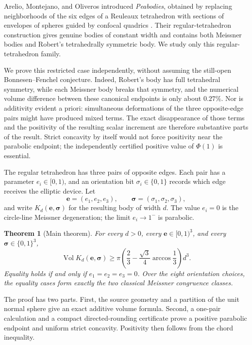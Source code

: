 \documentclass[11pt]{article}
\numberwithin{equation}{section}
\newtheorem{theorem}{Theorem}[section]
\theoremstyle{remark}
\newcommand{\Vol}{\operatorname{Vol}}
\begin{document}
Arelio, Montejano, and Oliveros introduced \emph{Peabodies}, obtained by replacing neighborhoods of the six edges of a Reuleaux tetrahedron with sections of envelopes of spheres guided by confocal quadrics \cite{ArelioMontejanoOliveros2023}.  Their regular-tetrahedron construction gives genuine bodies of constant width and contains both Meissner bodies and Robert's tetrahedrally symmetric body.  We study only this regular-tetrahedron family.

We prove this restricted case independently, without assuming the still-open Bonnesen--Fenchel conjecture.  Indeed, Robert's body has full tetrahedral symmetry, while each Meissner body breaks that symmetry, and the numerical volume difference between these canonical endpoints is only about $0.27\%$.  Nor is additivity evident a priori: simultaneous deformations of the three opposite-edge pairs might have produced mixed terms.  The exact disappearance of those terms and the positivity of the resulting scalar increment are therefore substantive parts of the result.  Strict concavity by itself would not force positivity near the parabolic endpoint; the independently certified positive value of $\Phi(1)$ is essential.

The regular tetrahedron has three pairs of opposite edges.  Each pair has a parameter \(e_i\in[0,1)\), and an orientation bit \(\sigma_i\in\{0,1\}\) records which edge receives the elliptic device.  Let
\[
  \mathbf e=(e_1,e_2,e_3),\qquad
  \boldsymbol\sigma=(\sigma_1,\sigma_2,\sigma_3),
\]
and write \(K_d(\mathbf e,\boldsymbol\sigma)\) for the resulting body of width \(d\).  The value \(e_i=0\) is the circle-line Meissner degeneration; the limit \(e_i\to1^-\) is parabolic.

\begin{theorem}[Main theorem]
\label{thm:main}
For every \(d>0\), every \(\mathbf e\in[0,1)^3\), and every \(\boldsymbol\sigma\in\{0,1\}^3\),
\begin{equation}
  \Vol K_d(\mathbf e,\boldsymbol\sigma)
  \ge
  \pi\left(\frac23-\frac{\sqrt3}{4}\arccos\frac13\right)d^3.
  \label{eq:main}
\end{equation}
Equality holds if and only if \(e_1=e_2=e_3=0\).  Over the eight orientation choices, the equality cases form exactly the two classical Meissner congruence classes.
\end{theorem}

The proof has two parts.  First, the source geometry and a partition of the unit normal sphere give an exact additive volume formula.  Second, a one-pair calculation and a compact directed-rounding certificate prove a positive parabolic endpoint and uniform strict concavity.  Positivity then follows from the chord inequality.
\end{document}
